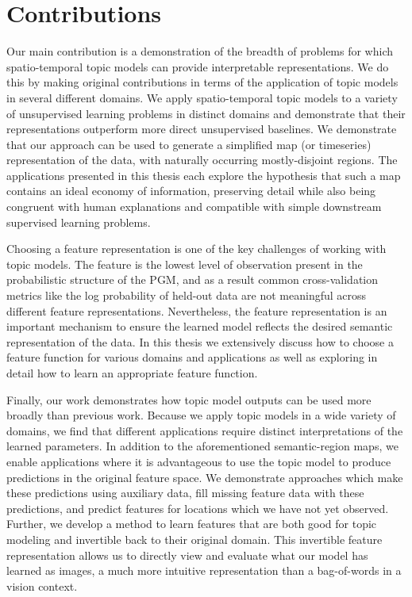 \section{Contributions} \label{sec:intro-contributions}
Our main contribution is a demonstration of the breadth of problems for which spatio-temporal topic models can provide interpretable representations. We do this by making original contributions in terms of the application of topic models in several different domains. We apply spatio-temporal topic models to a variety of unsupervised learning problems in distinct domains and demonstrate that their representations outperform more direct unsupervised baselines. We demonstrate that our approach can be used to generate a simplified map (or timeseries) representation of the data, with naturally occurring mostly-disjoint regions. The applications presented in this thesis each explore the hypothesis that such a map contains an ideal economy of information, preserving detail while also being congruent with human explanations and compatible with simple downstream supervised learning problems.

Choosing a feature representation is one of the key challenges of working with topic models. The feature is the lowest level of observation present in the probabilistic structure of the PGM, and as a result common cross-validation metrics like the log probability of held-out data are not meaningful across different feature representations. Nevertheless, the feature representation is an important mechanism to ensure the learned model reflects the desired semantic representation of the data. In this thesis we extensively discuss how to choose a feature function for various domains and applications as well as exploring in detail how to learn an appropriate feature function.

Finally, our work demonstrates how topic model outputs can be used more broadly than previous work. Because we apply topic models in a wide variety of domains, we find that different applications require distinct interpretations of the learned parameters. In addition to the aforementioned semantic-region maps, we enable applications where it is advantageous to use the topic model to produce predictions in the original feature space. We demonstrate approaches which make these predictions using auxiliary data, fill missing feature data with these predictions, and predict features for locations which we have not yet observed. Further, we develop a method to learn features that are both good for topic modeling and invertible back to their original domain. This invertible feature representation allows us to directly view and evaluate what our model has learned as images, a much more intuitive representation than a bag-of-words in a vision context.

